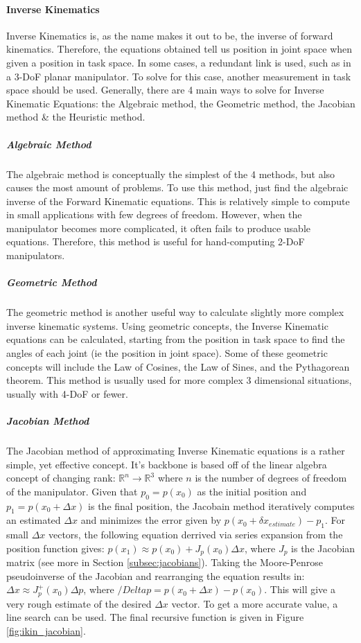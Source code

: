             \paragraph*{Inverse Kinematics}
            Inverse Kinematics is, as the name makes it out to be, the inverse of forward kinematics. Therefore, the equations obtained tell us position in joint space when given a position in task space. In some cases, a redundant link is used, such as in a 3-DoF planar manipulator. To solve for this case, another measurement in task space should be used. Generally, there are 4 main ways to solve for Inverse Kinematic Equations: the Algebraic method, the Geometric method, the Jacobian method \& the Heuristic method.
            \subparagraph*{Algebraic Method}
                The algebraic method is conceptually the simplest of the 4 methods, but also causes the most amount of problems. To use this method, just find the algebraic inverse of the Forward Kinematic equations. This is relatively simple to compute in small applications with few degrees of freedom. However, when the manipulator becomes more complicated, it often fails to produce usable equations. Therefore, this method is useful for hand-computing 2-DoF manipulators.
            \subparagraph*{Geometric Method}
                The geometric method is another useful way to calculate slightly more complex inverse kinematic systems. Using geometric concepts, the Inverse Kinematic equations can be calculated, starting from the position in task space to find the angles of each joint (ie the position in joint space). Some of these geometric concepts will include the Law of Cosines, the Law of Sines, and the Pythagorean theorem. This method is usually used for more complex 3 dimensional situations, usually with 4-DoF or fewer.
            \subparagraph*{Jacobian Method}
                The Jacobian method of approximating Inverse Kinematic equations is a rather simple, yet effective concept. It's backbone is based off of the linear algebra concept of changing rank: $\mathbb{R}^n \rightarrow \mathbb{R}^3$ where $n$ is the number of degrees of freedom of the manipulator. Given that $p_0 = p(x_0)$ as the initial position and $p_1 = p(x_0 + \Delta x)$ is the final position, the Jacobain method iteratively computes an estimated $\Delta x$ and minimizes the error given by $p(x_0 + \delta x_{estimate}) - p_1$. For small $\Delta x$ vectors, the following equation derrived via series expansion from the position function gives: $p(x_1) \approx p(x_0) + J_p (x_0)\Delta x$, where $J_p$ is the Jacobian matrix (see more in Section \ref{subsec:jacobians}). Taking the Moore-Penrose pseudoinverse \cite{wikipedia_pseudoinverse} of the Jacobian and rearranging the equation results in: $\Delta x \approx J_p^+(x_0)\Delta p$, where $/Delta p = p(x_0 + \Delta x) - p(x_0)$. This will give a very rough estimate of the desired $\Delta x$ vector. To get a more accurate value, a line search can be used. The final recursive function is given in Figure \ref{fig:ikin_jacobian}. \cite{wikipedia_ikin}
